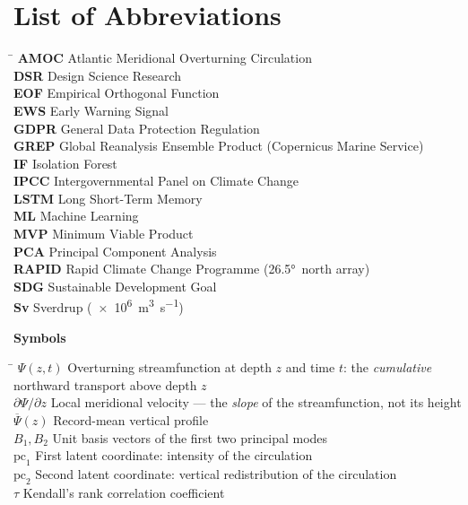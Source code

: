\chapter*{List of Abbreviations}

\begin{tabbing}
\hspace{3.5cm} \= \kill
\textbf{AMOC} \> Atlantic Meridional Overturning Circulation \\
\textbf{DSR} \> Design Science Research \\
\textbf{EOF} \> Empirical Orthogonal Function \\
\textbf{EWS} \> Early Warning Signal \\
\textbf{GDPR} \> General Data Protection Regulation \\
\textbf{GREP} \> Global Reanalysis Ensemble Product (Copernicus Marine Service) \\
\textbf{IF} \> Isolation Forest \\
\textbf{IPCC} \> Intergovernmental Panel on Climate Change \\
\textbf{LSTM} \> Long Short-Term Memory \\
\textbf{ML} \> Machine Learning \\
\textbf{MVP} \> Minimum Viable Product \\
\textbf{PCA} \> Principal Component Analysis \\
\textbf{RAPID} \> Rapid Climate Change Programme (\ang{26.5}~north array) \\
\textbf{SDG} \> Sustainable Development Goal \\
\textbf{Sv} \> Sverdrup (\SI{e6}{\cubic\metre\per\second}) \\
\end{tabbing}

\vspace{1cm}

\noindent\textbf{Symbols}

\vspace{0.3cm}

\begin{tabbing}
\hspace{3.5cm} \= \kill
$\Psi(z,t)$ \> Overturning streamfunction at depth $z$ and time $t$: the \emph{cumulative}
northward transport above depth $z$ \\
$\partial\Psi/\partial z$ \> Local meridional velocity --- the \emph{slope} of the
streamfunction, not its height \\
$\overline{\Psi}(z)$ \> Record-mean vertical profile \\
$B_1, B_2$ \> Unit basis vectors of the first two principal modes \\
$\mathrm{pc}_1$ \> First latent coordinate: intensity of the circulation \\
$\mathrm{pc}_2$ \> Second latent coordinate: vertical redistribution of the circulation \\
$\tau$ \> Kendall's rank correlation coefficient \\
\end{tabbing}

\cleardoublepage
